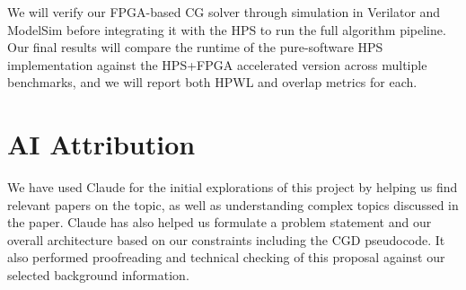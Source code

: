 \documentclass[conference]{IEEEtran}
\begin{document}
We will verify our FPGA-based CG solver through simulation in Verilator and ModelSim before integrating it with the HPS to run the full algorithm pipeline. Our final results will compare the runtime of the pure-software HPS implementation against the HPS+FPGA accelerated version across multiple benchmarks, and we will report both HPWL and overlap metrics for each.

\section{AI Attribution}
We have used Claude for the initial explorations of this project by helping us find relevant papers on the topic, as well as understanding complex topics discussed in the paper. Claude has also helped us formulate a problem statement and our overall architecture based on our constraints including the CGD pseudocode. It also performed proofreading and technical checking of this proposal against our selected background information.



\end{document}

